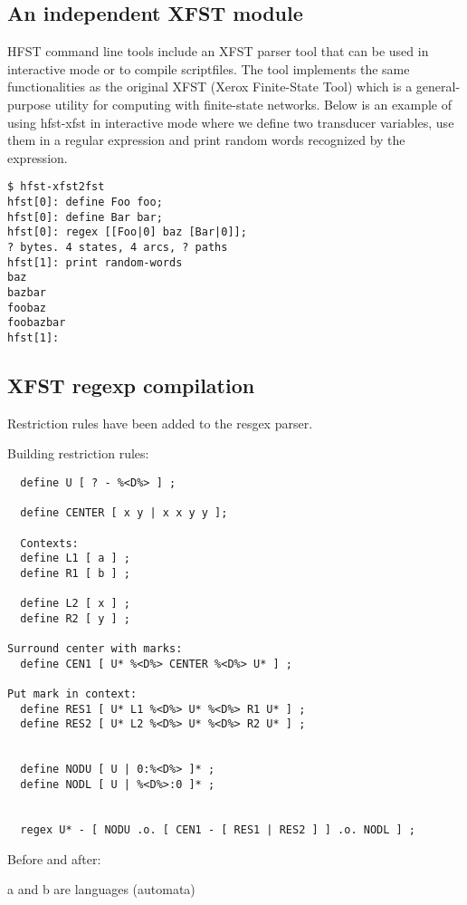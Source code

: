 \documentclass{llncs}
\begin{document}
\subsection{An independent XFST module}

HFST command line tools include an XFST parser tool that can be used in interactive
mode or to compile scriptfiles. The tool implements the same functionalities as the
original XFST (Xerox Finite-State Tool) which is a general-purpose utility for computing
with finite-state networks. Below is an example of using hfst-xfst in interactive mode
where we define two transducer variables, use them in a regular expression and print
random words recognized by the expression.

\begin{verbatim}
$ hfst-xfst2fst 
hfst[0]: define Foo foo;
hfst[0]: define Bar bar;
hfst[0]: regex [[Foo|0] baz [Bar|0]];
? bytes. 4 states, 4 arcs, ? paths
hfst[1]: print random-words
baz
bazbar
foobaz
foobazbar
hfst[1]: 
\end{verbatim}

\subsection{XFST regexp compilation}

Restriction rules have been added to the resgex parser.

Building restriction rules:

\begin{verbatim}
  define U [ ? - %<D%> ] ;

  define CENTER [ x y | x x y y ];

  Contexts:
  define L1 [ a ] ;
  define R1 [ b ] ;

  define L2 [ x ] ;
  define R2 [ y ] ;
  
Surround center with marks:
  define CEN1 [ U* %<D%> CENTER %<D%> U* ] ;

Put mark in context:
  define RES1 [ U* L1 %<D%> U* %<D%> R1 U* ] ;
  define RES2 [ U* L2 %<D%> U* %<D%> R2 U* ] ;
  
  
  define NODU [ U | 0:%<D%> ]* ;
  define NODL [ U | %<D%>:0 ]* ;

 
  regex U* - [ NODU .o. [ CEN1 - [ RES1 | RES2 ] ] .o. NODL ] ;
   \end{verbatim}     
        
Before and after:

a and b are languages (automata)
\end{document}
